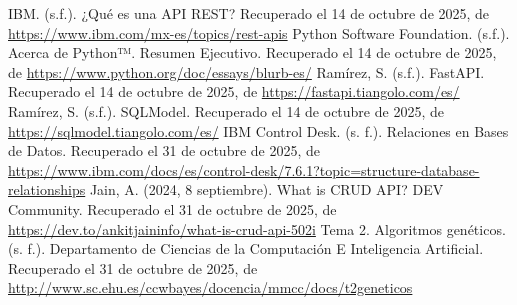 \documentclass[12pt]{article}
\begin{document}
\newpage %

\begin{thebibliography}{99}

     IBM. (s.f.). ¿Qué es una API REST? Recuperado el 14 de octubre de 2025, de \url{https://www.ibm.com/mx-es/topics/rest-apis}
     Python Software Foundation. (s.f.). Acerca de Python™. Resumen Ejecutivo. Recuperado el 14 de octubre de 2025, de \url{https://www.python.org/doc/essays/blurb-es/}
     Ramírez, S. (s.f.). FastAPI. Recuperado el 14 de octubre de 2025, de \url{https://fastapi.tiangolo.com/es/}
     Ramírez, S. (s.f.). SQLModel. Recuperado el 14 de octubre de 2025, de \url{https://sqlmodel.tiangolo.com/es/}
     IBM Control Desk. (s. f.). Relaciones en Bases de Datos. Recuperado el 31 de octubre de 2025, de \url{ https://www.ibm.com/docs/es/control-desk/7.6.1?topic=structure-database-relationships}
     Jain, A. (2024, 8 septiembre). What is CRUD API? DEV Community. Recuperado el 31 de octubre de 2025, de \url{https://dev.to/ankitjaininfo/what-is-crud-api-502i}
     Tema 2. Algoritmos genéticos. (s. f.). Departamento de Ciencias de la Computación E Inteligencia Artificial. Recuperado el 31 de octubre de 2025, de \url{http://www.sc.ehu.es/ccwbayes/docencia/mmcc/docs/t2geneticos}

\end{thebibliography}
\end{document}
